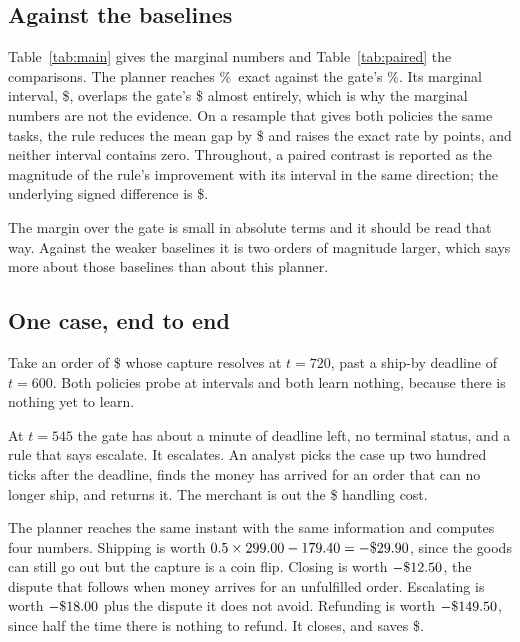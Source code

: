 \documentclass[conference]{IEEEtran}
\begin{document}
\subsection{Against the baselines}

Table~\ref{tab:main} gives the marginal numbers and Table~\ref{tab:paired} the
comparisons. The planner reaches \planExact\%\ exact against the gate's
\gateExact\%. Its marginal interval, \$\planGapCI, overlaps the gate's
\$\gateGapCI{} almost entirely, which is why the marginal numbers are not the
evidence. On a resample that gives both policies the same tasks, the rule
reduces the mean gap by \$\vsGateReduction{} and raises the exact rate by
\vsGateExact{} points, and neither interval contains zero. Throughout, a
paired contrast is reported as the magnitude of the rule's improvement with
its interval in the same direction; the underlying signed difference is
\$\vsGateGap{}.

The margin over the gate is small in absolute terms and it should be read that
way. Against the weaker baselines it is two orders of magnitude larger, which
says more about those baselines than about this planner.

\subsection{One case, end to end}

Take an order of \$\exBigAmount{} whose capture resolves at $t=720$, past a ship-by
deadline of $t=600$. Both policies probe at intervals and both learn nothing,
because there is nothing yet to learn.

At $t=545$ the gate has about a minute of deadline left, no terminal status,
and a rule that says escalate. It escalates. An analyst picks the case up two
hundred ticks after the deadline, finds the money has arrived for an order that
can no longer ship, and returns it. The merchant is out the \$\exEscalate{}
handling cost.

The planner reaches the same instant with the same information and computes
four numbers. Shipping is worth $0.5 \times 299.00{} - 179.40{} =
-\$29.90{}$, since the goods can still go out but the capture is a coin
flip. Closing is worth $-\$12.50{}$, the dispute that follows when money
arrives for an unfulfilled order. Escalating is worth $-\$18.00{}$ plus
the dispute it does not avoid. Refunding is worth $-\$149.50{}$, since
half the time there is nothing to refund. It closes, and saves
\$\exBigSaved{}.
\end{document}
